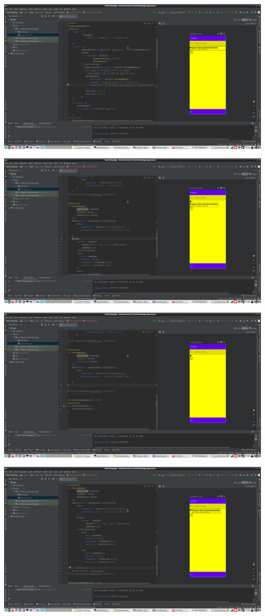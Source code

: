 \documentclass[11pt]{article}
\begin{document}
\begin{center}
\includegraphics[width=.9\linewidth]{./Captura de tela de 2023-03-29 17-13-31.png}
\end{center}
\begin{center}
\includegraphics[width=.9\linewidth]{./Captura de tela de 2023-03-29 17-25-05.png}
\end{center}
\begin{center}
\includegraphics[width=.9\linewidth]{./Captura de tela de 2023-03-29 17-25-36.png}
\end{center}
\begin{center}
\includegraphics[width=.9\linewidth]{./Captura de tela de 2023-03-29 17-26-33.png}
\end{center}
\end{document}
